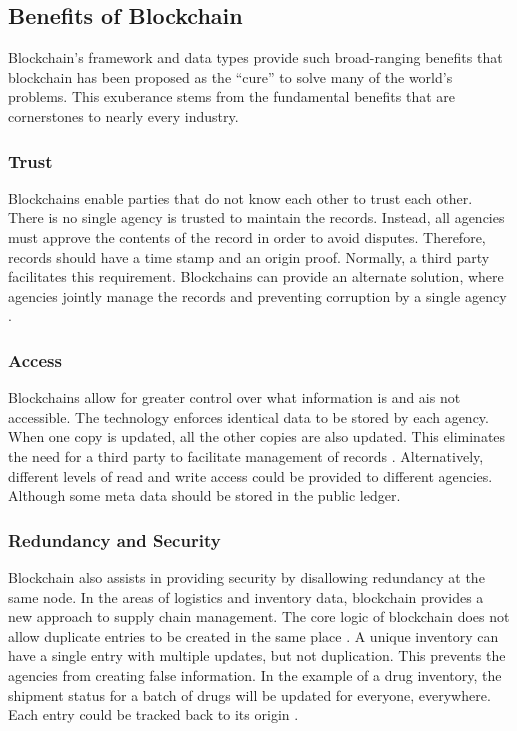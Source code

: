 \documentclass[sigconf]{acmart}
\begin{document}
\subsection{Benefits of Blockchain}
Blockchain's framework and data types provide such broad-ranging benefits that blockchain has been proposed as the ``cure'' to solve many of the world's problems. This exuberance stems from the fundamental benefits that are cornerstones to nearly every industry.

\subsubsection{Trust} Blockchains enable parties that do not know each other to trust each other. There is no single agency is trusted to maintain the records. Instead, all agencies must approve the contents of the record in order to avoid disputes. Therefore, records should have a time stamp and an origin proof. Normally, a third party facilitates this requirement. Blockchains can provide an alternate solution, where agencies jointly manage the records and preventing corruption by a single agency \cite{arbc1}. 

\subsubsection{Access} Blockchains allow for greater control over what information is and ais not accessible. The technology enforces identical data to be stored by each agency. When one copy is updated, all the other copies are also updated. This eliminates the need for a third party to facilitate management of records \cite{arbc3}. Alternatively, different levels of read and write access could be provided to different agencies. Although some meta data should be stored in the public ledger. 

\subsubsection{Redundancy and Security} Blockchain also assists in providing security by disallowing redundancy at the same node. In the areas of logistics and inventory data, blockchain provides a new approach to supply chain management. The core logic of blockchain does not allow duplicate entries to be created in the same place \cite{arbc4}. A unique inventory can have a single entry with multiple updates, but not duplication. This prevents the agencies from creating false information. In the example of a drug inventory, the shipment status for a batch of drugs will be updated for everyone, everywhere. Each entry could be tracked back to its origin \cite{arbc4}. 
\end{document}

